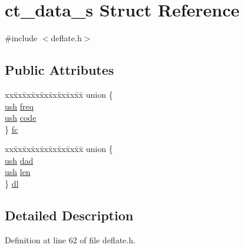 \hypertarget{structct__data__s}{\section{ct\-\_\-data\-\_\-s Struct Reference}
\label{structct__data__s}
}


{\ttfamily \#include $<$deflate.\-h$>$}

\subsection*{Public Attributes}
\begin{DoxyCompactItemize}
\item 
\begin{tabbing}
xx\=xx\=xx\=xx\=xx\=xx\=xx\=xx\=xx\=\kill
union \{\\
\>\hyperlink{zutil_8h_a3754180d606d4ed15468d15d9665aa2e}{ush} \hyperlink{structct__data__s_a67cd3c3267ba768c4494b36d5929c4bf}{freq}\\
\>\hyperlink{zutil_8h_a3754180d606d4ed15468d15d9665aa2e}{ush} \hyperlink{structct__data__s_a242f709ab288db2d155e28ce98c510c5}{code}\\
\} \hyperlink{structct__data__s_ad14c7dd62b683cbd581a27c0ea0d0b11}{fc}\\

\end{tabbing}\item 
\begin{tabbing}
xx\=xx\=xx\=xx\=xx\=xx\=xx\=xx\=xx\=\kill
union \{\\
\>\hyperlink{zutil_8h_a3754180d606d4ed15468d15d9665aa2e}{ush} \hyperlink{structct__data__s_a73955d00dbdac5ad4027804a00726bfa}{dad}\\
\>\hyperlink{zutil_8h_a3754180d606d4ed15468d15d9665aa2e}{ush} \hyperlink{structct__data__s_ad7f6929b2907e046dfbc8f091b494cfb}{len}\\
\} \hyperlink{structct__data__s_ac5b7c7528807e1fcc3d1a201c82dba35}{dl}\\

\end{tabbing}\end{DoxyCompactItemize}


\subsection{Detailed Description}


Definition at line 62 of file deflate.\-h.



